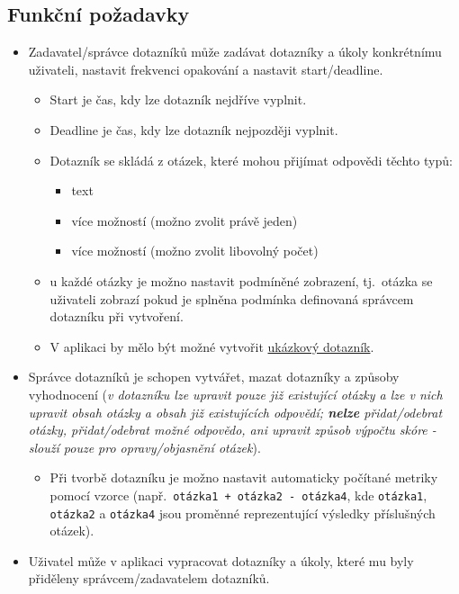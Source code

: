 \subsection{Funkční požadavky}\label{subsec:funkcni-pozadavky}
\begin{itemize}
\item
  Zadavatel/správce dotazníků může zadávat dotazníky a úkoly konkrétnímu uživateli, nastavit frekvenci opakování a nastavit start/deadline.

  \begin{itemize}
  \item
    Start je čas, kdy lze dotazník nejdříve vyplnit.
  \item
    Deadline je čas, kdy lze dotazník nejpozději vyplnit.
  \item
    Dotazník se skládá z otázek, které mohou přijímat odpovědi těchto typů:

    \begin{itemize}
    \item
      text
    \item
      více možností (možno zvolit právě jeden)
    \item
      více možností (možno zvolit libovolný počet)
    \end{itemize}
  \item
    u každé otázky je možno nastavit podmíněné zobrazení, tj.\ otázka se uživateli zobrazí pokud je splněna podmínka definovaná správcem dotazníku při vytvoření.
  \item
    V aplikaci by mělo být možné vytvořit \hyperref[sec:ukazkovyDotaznik]{ukázkový dotazník}.
  \end{itemize}
\item
  Správce dotazníků je schopen vytvářet, mazat dotazníky a způsoby vyhodnocení (\emph{v dotazníku lze upravit pouze již existující otázky a lze v nich upravit obsah otázky a obsah již existujících odpovědí; \textbf{nelze} přidat/odebrat otázky, přidat/odebrat možné odpovědo, ani upravit způsob výpočtu skóre - slouží pouze pro opravy/objasnění otázek}).

  \begin{itemize}
  \item
    Při tvorbě dotazníku je možno nastavit automaticky počítané metriky pomocí vzorce (např.\ \texttt{otázka1\ +\ otázka2\ -\ otázka4}, kde \texttt{otázka1}, \texttt{otázka2} a \texttt{otázka4} jsou proměnné reprezentující výsledky příslušných otázek).
  \end{itemize}
\item
  Uživatel může v aplikaci vypracovat dotazníky a úkoly, které mu byly přiděleny správcem/zadavatelem dotazníků.


\end{itemize}
